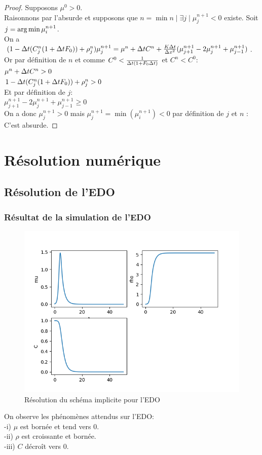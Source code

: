 \begin{proof} Supposons $\mu^0 >0$.\\ Raisonnons par l'absurde et supposons que $n=\min{n \mid \exists j \mid \mu^{n+1}_j < 0}$ existe. Soit $j = \operatorname*{arg\,min}{\mu^{n+1}_i}$.\\
On a $(1-\Delta t(C^{n}_j(1+\Delta t F_0)) + \rho^{n}_j)\mu^{n+1}_j = \mu^{n}+  \Delta t C^{n} +\frac{K\Delta t}{\Delta x^2}(\mu^{n+1}_{j+1} - 2\mu^{n+1}_j + \mu^{n+1}_{j-1}) $. \\
Or par définition de $n$ et comme $C^0< \frac{1}{\Delta t(1+F_0\Delta t)}$ et $C^n < C^0$:\\
 $ \mu^{n}+  \Delta t C^{n} > 0$ \\
 $ 1-\Delta t(C^{n}_j(1+\Delta t F_0)) + \rho^{n}_j > 0$ \\
Et par définition de $j$: \\
$\mu^{n+1}_{j+1} - 2\mu^{n+1}_j + \mu^{n+1}_{j-1} \geq 0$\\
On a donc $\mu^{n+1}_j > 0$ mais   $\mu^{n+1}_j = \min(\mu^{n+1}_i) < 0$ par définition de $j$ et $n$ : C'est absurde.
\end{proof}

\newpage
\section{Résolution numérique}
\subsection{Résolution de l'EDO}
\subsubsection{Résultat de la simulation de l'EDO}
\begin{figure}[hbt!]
\centering
\includegraphics[width=.9\textwidth]{Images/edo_euler_implicite.png}
\caption{Résolution du schéma implicite pour l'EDO}
\end{figure}
 On observe les phénomènes attendus sur l'EDO:\\
 -i) $\mu$ est bornée et tend vers 0.\\
 -ii) $\rho$ est croissante et bornée.\\
 -iii) $C$ décroît vers 0.
\newpage
